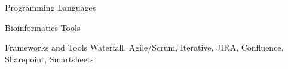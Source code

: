 

\begin{cvskills}

  \cvskill
    {Programming} %
    {Languages} %

  \cvskill
    {Bioinformatics} %
    {Tools} %


  \cvskill
    {Frameworks and Tools} %
    {Waterfall, Agile/Scrum, Iterative, JIRA, Confluence, Sharepoint, Smartsheets} %


  \cvskill
    {} %
    {} %

  \cvskill
    {} %
    {} %



\end{cvskills}

